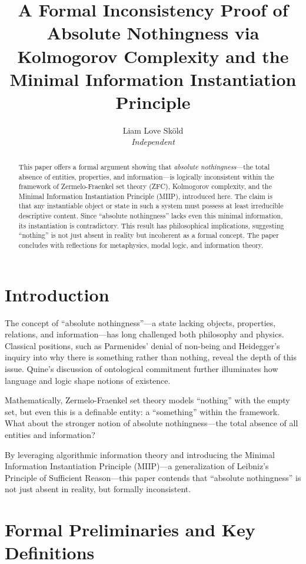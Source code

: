 \documentclass[12pt,a4paper]{article}
\title{A Formal Inconsistency Proof of Absolute Nothingness via Kolmogorov Complexity and the Minimal Information Instantiation Principle}
\author{Liam Love Sköld\\\textit{Independent}}
\date{}
\begin{document}
\maketitle

\begin{abstract}
This paper offers a formal argument showing that \emph{absolute nothingness}---the total absence of entities, properties, and information---is logically inconsistent within the framework of Zermelo-Fraenkel set theory (ZFC), Kolmogorov complexity, and the Minimal Information Instantiation Principle (MIIP), introduced here. The claim is that any instantiable object or state in such a system must possess at least irreducible descriptive content. Since ``absolute nothingness'' lacks even this minimal information, its instantiation is contradictory. This result has philosophical implications, suggesting ``nothing'' is not just absent in reality but incoherent as a formal concept. The paper concludes with reflections for metaphysics, modal logic, and information theory.
\end{abstract}

\section{Introduction}

The concept of ``absolute nothingness''---a state lacking objects, properties, relations, and information---has long challenged both philosophy and physics. Classical positions, such as Parmenides’ denial of non-being and Heidegger’s inquiry into why there is something rather than nothing, reveal the depth of this issue. Quine’s discussion of ontological commitment further illuminates how language and logic shape notions of existence.

Mathematically, Zermelo-Fraenkel set theory models ``nothing'' with the empty set, but even this is a definable entity: a ``something'' within the framework. What about the stronger notion of absolute nothingness---the total absence of all entities and information?

By leveraging algorithmic information theory and introducing the Minimal Information Instantiation Principle (MIIP)---a generalization of Leibniz’s Principle of Sufficient Reason---this paper contends that ``absolute nothingness'' is not just absent in reality, but formally inconsistent.

\section{Formal Preliminaries and Key Definitions}
\end{document}
